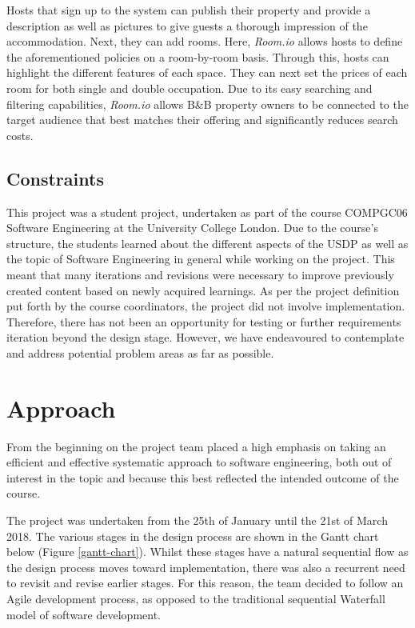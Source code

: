 Hosts that sign up to the system can publish their property and provide a description as well as pictures to give guests a thorough impression of the accommodation. Next, they can add rooms. Here, \textit{Room.io} allows hosts to define the aforementioned policies on a room-by-room basis. Through this, hosts can highlight the different features of each space. They can next set the prices of each room for both single and double occupation. Due to its easy searching and filtering capabilities, \textit{Room.io} allows B\&B property owners to be connected to the target audience that best matches their offering and significantly reduces search costs.

\subsection{Constraints}
This project was a student project, undertaken as part of the course COMPGC06 Software Engineering at the University College London. Due to the course's structure, the students learned about the different aspects of the USDP as well as the topic of Software Engineering in general while working on the project. This meant that many iterations and revisions were necessary to improve previously created content based on newly acquired learnings.
As per the project definition put forth by the course coordinators, the project did not involve implementation. Therefore, there has not been an opportunity for testing or further requirements iteration beyond the design stage. However, we have endeavoured to contemplate and address potential problem areas as far as possible. 

\section{Approach}
From the beginning on the project team placed a high emphasis on taking an efficient and effective systematic approach to software engineering, both out of interest in the topic and because this best reflected the intended outcome of the course.

The project was undertaken from the 25th of January until the 21st of March 2018. The various stages in the design process are shown in the Gantt chart below (Figure \ref{gantt-chart}). Whilst these stages have a natural sequential flow as the design process moves toward implementation, there was also a recurrent need to revisit and revise earlier stages. For this reason, the team decided to follow an Agile development process, as opposed to the traditional sequential Waterfall model of software development.

